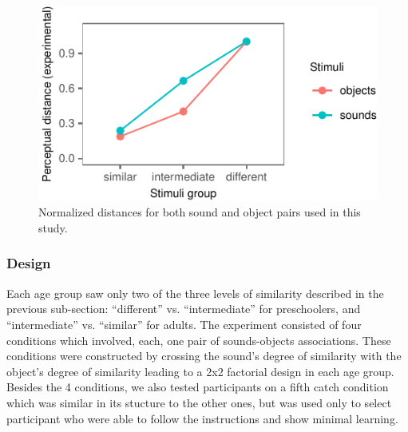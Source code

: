 \documentclass[10pt, letterpaper]{article}
\newenvironment{CodeChunk}{}{}
\begin{document}
\begin{CodeChunk}
\begin{figure}[h]

{\centering \includegraphics{figs/stim-1} 

}

\caption{\label{fig:stim}Normalized distances for both sound and object pairs used in this study.}\label{fig:stim}
\end{figure}
\end{CodeChunk}

\subsubsection{Design}\label{design}

Each age group saw only two of the three levels of similarity described
in the previous sub-section: ``different'' vs. ``intermediate'' for
preschoolers, and ``intermediate'' vs. ``similar'' for adults. The
experiment consisted of four conditions which involved, each, one pair
of sounds-objects associations. These conditions were constructed by
crossing the sound's degree of similarity with the object's degree of
similarity leading to a 2x2 factorial design in each age group. Besides
the 4 conditions, we also tested participants on a fifth catch condition
which was similar in its stucture to the other ones, but was used only
to select participant who were able to follow the instructions and show
minimal learning.
\end{document}
